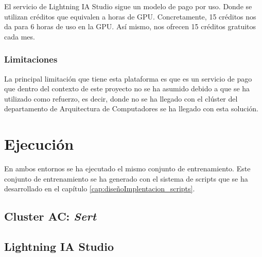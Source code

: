El servicio de Lightning IA Studio sigue un modelo de pago por uso. Donde se utilizan
créditos que equivalen a horas de GPU. Concretamente, 15 créditos nos da para 6 horas de
uso en la GPU. Así mismo, nos ofrecen 15 créditos gratuitos cada mes. \cite{lightningiaPricing}

\subsubsection{Limitaciones}
\label{subsubsec:limitaciones}


La principal limitación que tiene esta plataforma es que es un servicio de pago que dentro
del contexto de este proyecto no se ha asumido debido a que se ha utilizado como refuerzo, es
decir, donde no se ha llegado con el clúster del departamento de Arquitectura de Computadores
se ha llegado con esta solución.

\section{Ejecución}
\label{sec:ejecucion}

En ambos entornos se ha ejecutado el mismo conjunto de entrenamiento. Este conjunto de
entrenamiento se ha generado con el sistema de scripts que se ha desarrollado en el capítulo
\ref{cap:diseñoImplentacion_scripts}.

\subsection{Cluster AC: \textit{Sert}}
\label{subsec:cluster_ac_ejecucion}



\subsection{Lightning IA Studio}
\label{subsec:lightning_ia_studio_ejecucion}


